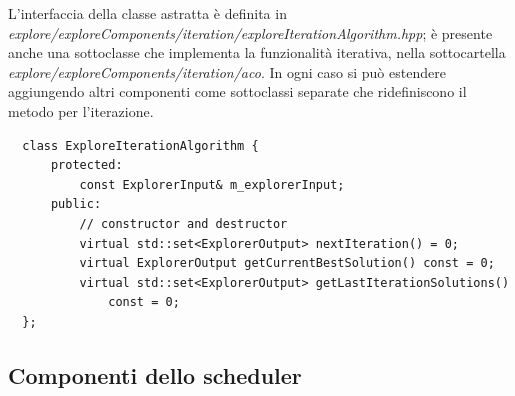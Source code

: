 L'interfaccia della classe astratta è definita in 
\emph{explore/exploreComponents/iteration/exploreIterationAlgorithm.hpp}; è 
presente anche una sottoclasse che implementa la funzionalità iterativa, nella 
sottocartella \emph{explore/exploreComponents/iteration/aco}. In ogni caso si 
può estendere aggiungendo altri componenti come sottoclassi separate che 
ridefiniscono il metodo per l'iterazione.
\newline
\begin{verbatim}
  class ExploreIterationAlgorithm {
      protected:
          const ExplorerInput& m_explorerInput;
      public:
          // constructor and destructor
          virtual std::set<ExplorerOutput> nextIteration() = 0;
          virtual ExplorerOutput getCurrentBestSolution() const = 0;
          virtual std::set<ExplorerOutput> getLastIterationSolutions()
              const = 0;
  };
\end{verbatim}



\subsection{Componenti dello scheduler}
\label{subsec:componentiScheduler}

